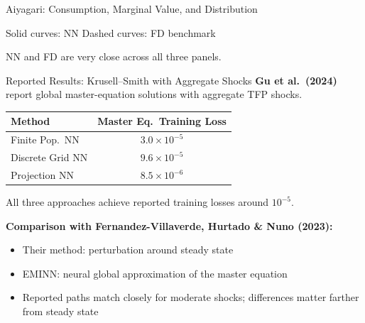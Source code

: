 \documentclass[aspectratio=169,11pt]{beamer}
\begin{document}
\begin{frame}[shrink=2]{Aiyagari: Consumption, Marginal Value, and Distribution}
\vspace{0.1em}
\begin{center}
{\scriptsize Solid curves: NN \qquad Dashed curves: FD benchmark}
\end{center}

\vspace{0.1em}
{\small NN and FD are very close across all three panels.}
\end{frame}

\begin{frame}{Reported Results: Krusell--Smith with Aggregate Shocks}
\footnotesize
\textbf{Gu et al.\ (2024)} report global master-equation solutions with aggregate TFP shocks.

\vspace{0.1em}
\begin{center}
\footnotesize
\renewcommand{\arraystretch}{1.1}
\begin{tabular}{lc}
\toprule
\textbf{Method} & \textbf{Master Eq.\ Training Loss} \\
\midrule
Finite Pop.\ NN & $3.0 \times 10^{-5}$ \\
Discrete Grid NN & $9.6 \times 10^{-5}$ \\
Projection NN & $8.5 \times 10^{-6}$ \\
\bottomrule
\end{tabular}
\end{center}

\vspace{0.15em}
All three approaches achieve reported training losses around $10^{-5}$.

\vspace{0.1em}
\textbf{Comparison with Fernandez-Villaverde, Hurtado \& Nuno (2023):}
\begin{itemize}\itemsep1pt
    \item Their method: perturbation around steady state
    \item EMINN: neural global approximation of the master equation
    \item Reported paths match closely for moderate shocks; differences matter farther from steady state
\end{itemize}
\end{frame}
\end{document}
